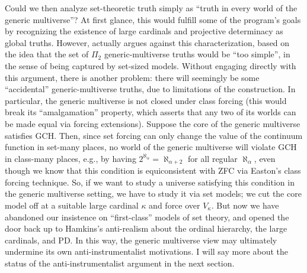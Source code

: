 \documentclass[letterpaper,12pt]{article}
\begin{document}
Could we then analyze set-theoretic truth simply as ``truth in every world of the generic multiverse''? At first glance, this would fulfill some of the program's goals by recognizing the existence of large cardinals and projective determinacy as global truths. However, \cite{woodin2009continuum} actually argues against this characterization, based on the idea that the set of $\Pi_2$ generic-multiverse truths would be ``too simple'', in the sense of being captured by set-sized models. Without engaging directly with this argument, there is another problem: there will seemingly be some ``accidental'' generic-multiverse truths, due to limitations of the construction. In particular, the generic multiverse is not closed under class forcing (this would break its ``amalgamation'' property, which asserts that any two of its worlds can be made equal via forcing extensions). Suppose the core of the generic multiverse satisfies GCH. Then, since set forcing can only change the value of the continuum function in set-many places, no world of the generic multiverse will violate GCH in class-many places, e.g., by having $2^{\aleph_\alpha} = \aleph_{\alpha + 2}$ for all regular $\aleph_\alpha$, even though we know that this condition is equiconsistent with ZFC via Easton's class forcing technique. So, if we want to study a universe satisfying this condition in the generic multiverse setting, we have to study it via set models; we cut the core model off at a suitable large cardinal $\kappa$ and force over $V_\kappa$. But now we have abandoned our insistence on ``first-class'' models of set theory, and opened the door back up to Hamkins's anti-realism about the ordinal hierarchy, the large cardinals, and PD. In this way, the generic multiverse view may ultimately undermine its own anti-instrumentalist motivations. I will say more about the status of the anti-instrumentalist argument in the next section.


\end{document}

